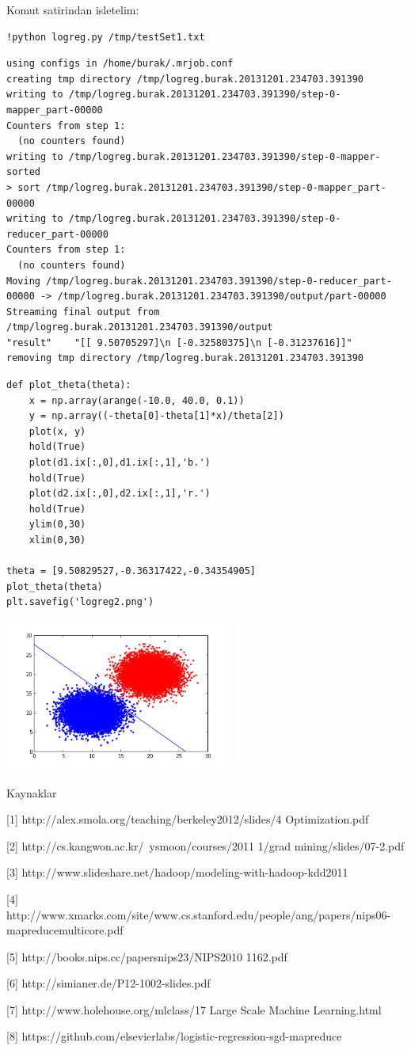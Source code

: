 \documentclass[12pt,fleqn]{article}\usepackage{../common}
\begin{document}
Komut satirindan isletelim:

\begin{verbatim}
!python logreg.py /tmp/testSet1.txt 
\end{verbatim}

\begin{verbatim}
using configs in /home/burak/.mrjob.conf
creating tmp directory /tmp/logreg.burak.20131201.234703.391390
writing to /tmp/logreg.burak.20131201.234703.391390/step-0-mapper_part-00000
Counters from step 1:
  (no counters found)
writing to /tmp/logreg.burak.20131201.234703.391390/step-0-mapper-sorted
> sort /tmp/logreg.burak.20131201.234703.391390/step-0-mapper_part-00000
writing to /tmp/logreg.burak.20131201.234703.391390/step-0-reducer_part-00000
Counters from step 1:
  (no counters found)
Moving /tmp/logreg.burak.20131201.234703.391390/step-0-reducer_part-00000 -> /tmp/logreg.burak.20131201.234703.391390/output/part-00000
Streaming final output from /tmp/logreg.burak.20131201.234703.391390/output
"result"	"[[ 9.50705297]\n [-0.32580375]\n [-0.31237616]]"
removing tmp directory /tmp/logreg.burak.20131201.234703.391390
\end{verbatim}

\begin{verbatim}
def plot_theta(theta):
    x = np.array(arange(-10.0, 40.0, 0.1))
    y = np.array((-theta[0]-theta[1]*x)/theta[2])
    plot(x, y)
    hold(True)
    plot(d1.ix[:,0],d1.ix[:,1],'b.')
    hold(True)
    plot(d2.ix[:,0],d2.ix[:,1],'r.')
    hold(True)
    ylim(0,30)
    xlim(0,30)

theta = [9.50829527,-0.36317422,-0.34354905]
plot_theta(theta)
plt.savefig('logreg2.png')
\end{verbatim}

\includegraphics[height=5cm]{logreg2.png}

Kaynaklar

[1] http://alex.smola.org/teaching/berkeley2012/slides/4 Optimization.pdf

[2] http://cs.kangwon.ac.kr/~ysmoon/courses/2011 1/grad mining/slides/07-2.pdf

[3] http://www.slideshare.net/hadoop/modeling-with-hadoop-kdd2011

[4] http://www.xmarks.com/site/www.cs.stanford.edu/people/ang/papers/nips06-mapreducemulticore.pdf

[5] http://books.nips.cc/papersnips23/NIPS2010 1162.pdf

[6] http://simianer.de/P12-1002-slides.pdf

[7] http://www.holehouse.org/mlclass/17 Large Scale Machine Learning.html

[8] https://github.com/elsevierlabs/logistic-regression-sgd-mapreduce
\end{document}

